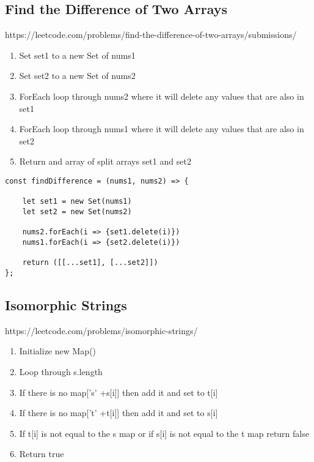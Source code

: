 \documentclass[10pt]{article}
\begin{document}
\medskip %











\pagebreak %
\medskip   
\subsection{Find the Difference of Two Arrays}
https://leetcode.com/problems/find-the-difference-of-two-arrays/submissions/

\begin{enumerate}
	\item Set set1 to a new Set of nums1
	\item Set set2 to a new Set of nums2
	\item ForEach loop through nums2 where it will delete any values that are also in set1
	\item ForEach loop through nums1 where it will delete any values that are also in set2
	\item Return and array of split arrays set1 and set2
\end{enumerate}

\begin{lstlisting}[title=Solution findDifference, captionpos=t]
const findDifference = (nums1, nums2) => {
    
    let set1 = new Set(nums1)
    let set2 = new Set(nums2)

    nums2.forEach(i => {set1.delete(i)})
    nums1.forEach(i => {set2.delete(i)})

    return ([[...set1], [...set2]])
};
\end{lstlisting}

\medskip %








\pagebreak %
\medskip   
\subsection{Isomorphic Strings}
https://leetcode.com/problems/isomorphic-strings/

\begin{enumerate}
	\item Initialize new Map()
	\item Loop through s.length 
	\item If there is no map['s' +s[i]] then add it and set to t[i]
	\item If there is no map['t' +t[i]] then add it and set to s[i]
	\item If t[i] is not equal to the s map or if s[i] is not equal to the t map return false 
	\item Return true
\end{enumerate}
\end{document}
